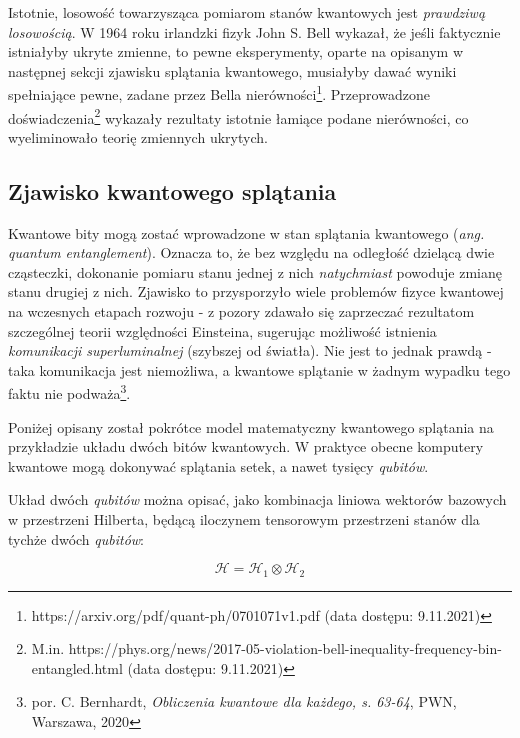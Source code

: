 \documentclass[12pt,a4paper,twoside,openany]{book}
\begin{document}
Istotnie, losowość towarzysząca pomiarom stanów kwantowych jest \textit{prawdziwą losowością}. W 1964 roku irlandzki fizyk John S. Bell wykazał, że jeśli faktycznie istniałyby ukryte zmienne, to pewne eksperymenty, oparte na opisanym w następnej sekcji zjawisku splątania kwantowego, musiałyby dawać wyniki spełniające pewne, zadane przez Bella nierówności\footnote{https://arxiv.org/pdf/quant-ph/0701071v1.pdf (data dostępu: 9.11.2021)}. Przeprowadzone doświadczenia\footnote{M.in. https://phys.org/news/2017-05-violation-bell-inequality-frequency-bin-entangled.html (data dostępu: 9.11.2021)} wykazały rezultaty istotnie łamiące podane nierówności, co wyeliminowało teorię zmiennych ukrytych.

\subsection{Zjawisko kwantowego splątania}

Kwantowe bity mogą zostać wprowadzone w stan splątania kwantowego (\textit{ang. quantum entanglement}). Oznacza to, że bez względu na odległość dzielącą dwie cząsteczki, dokonanie pomiaru stanu jednej z nich \textit{natychmiast} powoduje zmianę stanu drugiej z nich. Zjawisko to przysporzyło wiele problemów fizyce kwantowej na wczesnych etapach rozwoju - z pozory zdawało się zaprzeczać rezultatom szczególnej teorii względności Einsteina, sugerując możliwość istnienia \textit{komunikacji superluminalnej} (szybszej od światła). Nie jest to jednak prawdą - taka komunikacja jest niemożliwa, a kwantowe splątanie w żadnym wypadku tego faktu nie podważa\footnote{por. C. Bernhardt, \textit{Obliczenia kwantowe dla każdego, s. 63-64}, PWN,
Warszawa, 2020}.

Poniżej opisany został pokrótce model matematyczny kwantowego splątania na przykładzie układu dwóch bitów kwantowych. W praktyce obecne komputery kwantowe mogą dokonywać splątania setek, a nawet tysięcy \textit{qubitów}.

Układ dwóch \textit{qubitów} można opisać, jako kombinacja liniowa wektorów bazowych w przestrzeni Hilberta, będącą iloczynem tensorowym przestrzeni stanów dla tychże dwóch \textit{qubitów}:

\begin{equation}
    \mathcal{H} = \mathcal{H}_1 \otimes \mathcal{H}_2
\end{equation}
\end{document}
